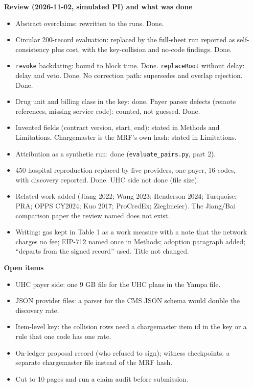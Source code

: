 \textbf{Review (2026-11-02, simulated PI) and what was done}
\begin{itemize}
\item Abstract overclaims: rewritten to the runs. Done.
\item Circular 200-record evaluation: replaced by the full-sheet run reported as self-consistency plus cost, with the key-collision and no-code findings. Done.
\item \texttt{revoke} backdating: bound to block time. Done. \texttt{replaceRoot} without delay: delay and veto. Done. No correction path: supersedes and overlap rejection. Done.
\item Drug unit and billing class in the key: done. Payer parser defects (remote references, missing service code): counted, not guessed. Done.
\item Invented fields (contract version, start, end): stated in Methods and Limitations. Chargemaster is the MRF's own hash: stated in Limitations.
\item Attribution as a synthetic run: done (\texttt{evaluate\_pairs.py}, part 2).
\item 450-hospital reproduction replaced by five providers, one payer, 16 codes, with discovery reported. Done. UHC side not done (file size).
\item Related work added (Jiang 2022; Wang 2023; Henderson 2024; Turquoise; PRA; OPPS CY2024; Kuo 2017; ProCredEx; Zieglmeier). The Jiang/Bai comparison paper the review named does not exist.
\item Writing: gas kept in Table 1 as a work measure with a note that the network charges no fee; EIP-712 named once in Methods; adoption paragraph added; ``departs from the signed record'' used. Title not changed.
\end{itemize}

\textbf{Open items}
\begin{itemize}
\item UHC payer side: one 9 GB file for the UHC plans in the Yampa file.
\item JSON provider files: a parser for the CMS JSON schema would double the discovery rate.
\item Item-level key: the \sheetCollisions{} collision rows need a chargemaster item id in the key or a rule that one code has one rate.
\item On-ledger proposal record (who refused to sign); witness checkpoints; a separate chargemaster file instead of the MRF hash.
\item Cut to 10 pages and run a claim audit before submission.
\end{itemize}

